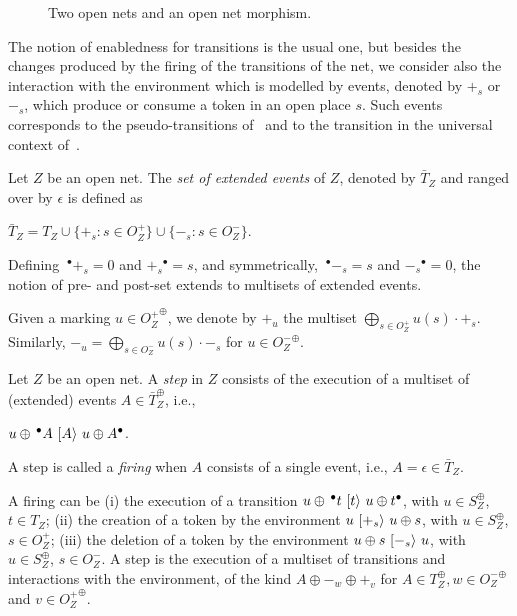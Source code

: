 \documentclass{LMCS}
\newcommand{\mon}[1]{\ensuremath{{#1}^\oplus}}
\newcommand{\monSub}[2]{\ensuremath{{#1}_{#2}^\oplus}}
\newcommand{\pre}[1][(\cdot)]{\ensuremath{\!~^\bullet{#1}}}
\newcommand{\post}[1][(\cdot)]{\ensuremath{{#1} {^\bullet}}}
\newcommand{\trans}[1]{\ensuremath{\ [\/{#1}\/\rangle}\ }
\begin{document}
\begin{figure}[t]
  \begin{center}
  \end{center}

  \caption{Two open nets and an open net morphism.}
  \label{fi:sample}
\end{figure}







The notion of enabledness for transitions is the usual one, but
besides the changes produced by the firing of the transitions of the
net, we consider also the interaction with the environment which is
modelled by events, denoted by $+_s$ or $-_s$, which produce or
consume a token in an open place $s$. 
Such events corresponds to the pseudo-transitions
of~\cite{v:modular-petri} and to the transition in the universal
context of~\cite{NPS:CBCP}.

\begin{defi}
  Let $Z$ be an open net.
The \emph{set of extended events} of $Z$, denoted by $\bar{T}_Z$ and
  ranged over by $\epsilon$ is defined as
  \begin{center}
    $\bar{T}_Z = T_Z \cup \{ +_s : s \in O_Z^+ \} \cup \{-_s : s \in O_Z^- \}$.
  \end{center}
Defining $\pre[+_s] = 0$ and $\post[+_s] = s$, and symmetrically,
  $\pre[-_s] = s$ and $\post[-_s] = 0$, the notion of pre- and
  post-set extends 
  to multisets of extended events.
\end{defi}

 Given a
marking $u \in \mon{O_Z^+}$, we  denote by $+_u$ the multiset
$\bigoplus_{s \in O_Z^+} u(s) \cdot +_s$.
Similarly, $-_u = \bigoplus_{s \in O_Z^-} u(s) \cdot -_s$ for $u \in
\mon{O_Z^-}$.   

\begin{defi}
  Let $Z$ be an open net.  A \emph{step} in $Z$ consists of the execution of a
  multiset of (extended) events $A \in \monSub{\bar{T}}{Z}$, i.e.,
  \begin{center}
    $u \oplus \pre[A] \trans{A} u \oplus \post[A]$.
  \end{center}
  A step is called a \emph{firing} when $A$ consists of a single event, i.e.,
  $A = \epsilon \in \bar{T}_Z$.
\end{defi}
A firing can be (i) the execution of a
transition $u \oplus \pre[t] \trans{t} u \oplus \post[t]$, with $u \in
\monSub{S}{Z}$, $t \in T_Z$;
(ii) the creation of a token by the environment $u \trans{+_s} u \oplus s$,
with $u \in \monSub{S}{Z}$, $s \in O_Z^+$;
(iii) the deletion of a token by the environment $u \oplus s \trans{-_s} u$,
with $u \in \monSub{S}{Z}$, $s \in O_Z^-$.
A step is the execution of a multiset of transitions and
interactions with the environment, of the kind $A \oplus
-_{w} \oplus +_{v}$ for  $A \in \monSub{T}{Z}, w \in \mon{O^-_Z}$
and $v \in \mon{O^+_Z}$.
\end{document}
